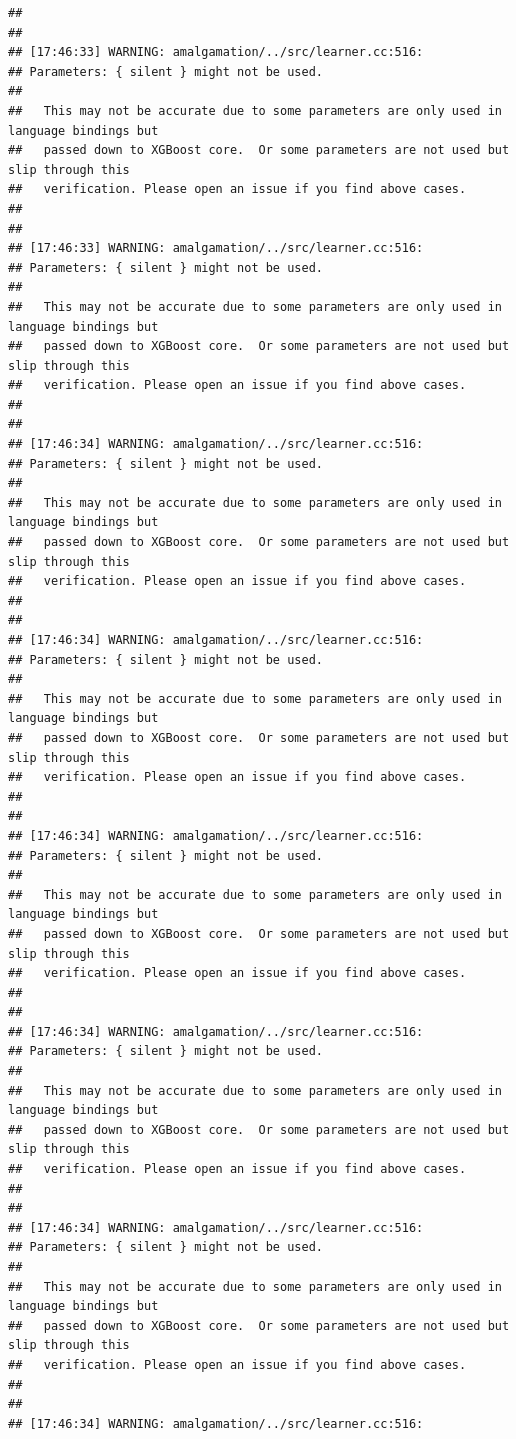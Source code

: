 \documentclass[AMS,STIX2COL]{WileyNJD-v2}\usepackage[]{graphicx}\usepackage[]{color}
\makeatletter
\newenvironment{kframe}{%
 \def\at@end@of@kframe{}%
 \ifinner\ifhmode%
  \def\at@end@of@kframe{\end{minipage}}%
  \begin{minipage}{\columnwidth}%
 \fi\fi%
 \def\FrameCommand##1{\hskip\@totalleftmargin \hskip-\fboxsep
 \colorbox{shadecolor}{##1}\hskip-\fboxsep
     \hskip-\linewidth \hskip-\@totalleftmargin \hskip\columnwidth}%
 \MakeFramed {\advance\hsize-\width
   \@totalleftmargin\z@ \linewidth\hsize
   \@setminipage}}%
 {\par\unskip\endMakeFramed%
 \at@end@of@kframe}
\newenvironment{knitrout}{}{} %
\makeatother
\begin{document}
\begin{knitrout}
\begin{kframe}
\begin{verbatim}
## 
## 
## [17:46:33] WARNING: amalgamation/../src/learner.cc:516: 
## Parameters: { silent } might not be used.
## 
##   This may not be accurate due to some parameters are only used in language bindings but
##   passed down to XGBoost core.  Or some parameters are not used but slip through this
##   verification. Please open an issue if you find above cases.
## 
## 
## [17:46:33] WARNING: amalgamation/../src/learner.cc:516: 
## Parameters: { silent } might not be used.
## 
##   This may not be accurate due to some parameters are only used in language bindings but
##   passed down to XGBoost core.  Or some parameters are not used but slip through this
##   verification. Please open an issue if you find above cases.
## 
## 
## [17:46:34] WARNING: amalgamation/../src/learner.cc:516: 
## Parameters: { silent } might not be used.
## 
##   This may not be accurate due to some parameters are only used in language bindings but
##   passed down to XGBoost core.  Or some parameters are not used but slip through this
##   verification. Please open an issue if you find above cases.
## 
## 
## [17:46:34] WARNING: amalgamation/../src/learner.cc:516: 
## Parameters: { silent } might not be used.
## 
##   This may not be accurate due to some parameters are only used in language bindings but
##   passed down to XGBoost core.  Or some parameters are not used but slip through this
##   verification. Please open an issue if you find above cases.
## 
## 
## [17:46:34] WARNING: amalgamation/../src/learner.cc:516: 
## Parameters: { silent } might not be used.
## 
##   This may not be accurate due to some parameters are only used in language bindings but
##   passed down to XGBoost core.  Or some parameters are not used but slip through this
##   verification. Please open an issue if you find above cases.
## 
## 
## [17:46:34] WARNING: amalgamation/../src/learner.cc:516: 
## Parameters: { silent } might not be used.
## 
##   This may not be accurate due to some parameters are only used in language bindings but
##   passed down to XGBoost core.  Or some parameters are not used but slip through this
##   verification. Please open an issue if you find above cases.
## 
## 
## [17:46:34] WARNING: amalgamation/../src/learner.cc:516: 
## Parameters: { silent } might not be used.
## 
##   This may not be accurate due to some parameters are only used in language bindings but
##   passed down to XGBoost core.  Or some parameters are not used but slip through this
##   verification. Please open an issue if you find above cases.
## 
## 
## [17:46:34] WARNING: amalgamation/../src/learner.cc:516: 

\end{verbatim}
\end{kframe}
\end{knitrout}
\end{document}
